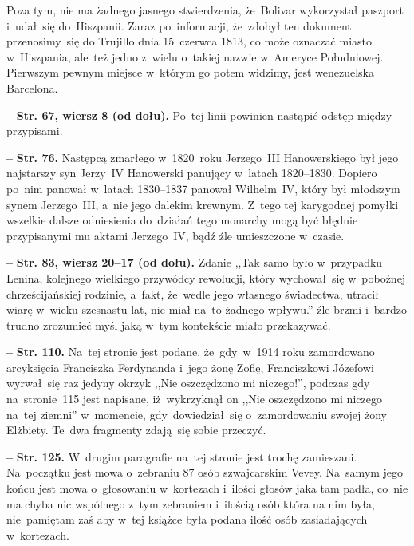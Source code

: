 \documentclass[a4paper,11pt]{article}
\newcommand{\spaceFour}{0.5em}
\newcommand{\tb}{\textbf}
\newcommand{\noi}{\noindent}
\newcommand{\start}{\noi \tb{--} {}}
\newcommand{\Str}[1]{\tb{Str. #1.}}
\newcommand{\StrWd}[2]{\tb{Str. #1, wiersz #2 (od dołu).}}
\begin{document}
Poza tym, nie ma żadnego jasnego stwierdzenia, że~Bolivar wykorzystał
paszport i~udał~się do~Hiszpanii. Zaraz po~informacji, że~zdobył ten
dokument przenosimy~się do Trujillo dnia 15~czerwca 1813, co może
oznaczać miasto w~Hiszpania, ale~też jedno z~wielu o~takiej nazwie
w~Ameryce Południowej. Pierwszym pewnym miejsce w~którym go potem
widzimy, jest wenezuelska Barcelona.

\vspace{\spaceFour}


\start \StrWd{67}{8} Po~tej linii powinien nastąpić odstęp między
przypisami.

\vspace{\spaceFour}


\start \Str{76} Następcą zmarłego w~1820~roku Jerzego~III
Hanowerskiego był jego najstarszy syn Jerzy~IV Hanowerski panujący
w~latach 1820--1830. Dopiero po~nim panował w~latach 1830--1837
panował Wilhelm~IV, który był młodszym synem Jerzego~III, a~nie jego
dalekim krewnym. Z~tego tej karygodnej pomyłki wszelkie dalsze
odniesienia do~działań tego monarchy mogą być błędnie przypisanymi mu
aktami Jerzego~IV, bądź źle umieszczone w~czasie.

\vspace{\spaceFour}


\start \StrWd{83}{20--17} Zdanie ,,Tak samo było w~przypadku Lenina,
kolejnego wielkiego przywódcy rewolucji, który wychował~się w~pobożnej
chrześcijańskiej rodzinie, a~fakt, że~wedle jego własnego świadectwa,
utracił wiarę w~wieku szesnastu lat, nie miał na~to żadnego wpływu.''
źle brzmi i~bardzo trudno zrozumieć myśl jaką w~tym kontekście miało
przekazywać.

\vspace{\spaceFour}


\start \Str{110} Na~tej stronie jest podane, że~gdy~w~1914 roku
zamordowano arcyksięcia Franciszka Ferdynanda i~jego żonę Zofię,
Franciszkowi Józefowi wyrwał~się raz jedyny okrzyk ,,Nie oszczędzono
mi niczego!'', podczas gdy na~stronie~115 jest napisane, iż~wykrzyknął
on ,,Nie oszczędzono mi niczego na~tej ziemni'' w~momencie,
gdy~dowiedział~się o~zamordowaniu swojej żony Elżbiety. Te~dwa
fragmenty zdają~się sobie przeczyć.

\vspace{\spaceFour}

\start \Str{125} W~drugim paragrafie na~tej stronie jest trochę
zamieszani. Na~początku jest mowa o~zebraniu 87 osób szwajcarskim
Vevey. Na~samym jego końcu jest mowa o~głosowaniu w~kortezach i~ilości
głosów jaka tam padła, co~nie ma chyba nic wspólnego z~tym zebraniem
i~ilością osób która na nim była, nie~pamiętam zaś aby w~tej książce
była podana ilość osób zasiadających w~kortezach.
\end{document}
